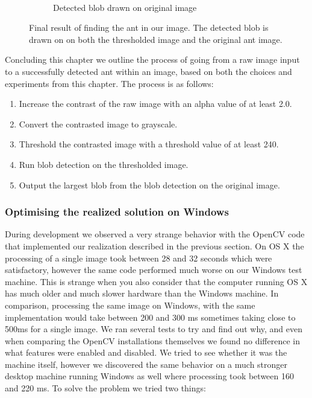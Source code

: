 \begin{figure}
\begin{subfigure}[b]{0.45\textwidth}
                \caption{\mbox{}\\Detected blob drawn on original image}
        \end{subfigure}
		\caption{Final result of finding the ant in our image. The detected blob is drawn on on both the thresholded image and the original ant image.}
		\label{fig:finalResult}
\end{figure}

Concluding this chapter we outline the process of going from a raw image input to a successfully detected ant within an image, based on both the choices and experiments from this chapter. The process is as follows:

\begin{enumerate}
    \item Increase the contrast of the raw image with an alpha value of at least 2.0.
    \item Convert the contrasted image to grayscale.
    \item Threshold the contrasted image with a threshold value of at least 240.
    \item Run blob detection on the thresholded image.
    \item Output the largest blob from the blob detection on the original image.
\end{enumerate}

\subsubsection{Optimising the realized solution on Windows} \mbox{}\par
During development we observed a very strange behavior with the OpenCV code that implemented our realization described in the previous section. On OS X the processing of a single image took between 28 and 32 seconds which were satisfactory, however the same code performed much worse on our Windows test machine. This is strange when you also consider that the computer running OS X has much older and much slower hardware than the Windows machine. In comparison, processing the same image on Windows, with the same implementation would take between 200 and 300 ms sometimes taking close to 500ms for a single image. We ran several tests to try and find out why, and even when comparing the OpenCV installations themselves we found no difference in what features were enabled and disabled. We tried to see whether it was the machine itself, however we discovered the same behavior on a much stronger desktop machine running Windows as well where processing took between 160 and 220 ms. To solve the problem we tried two things:\\

